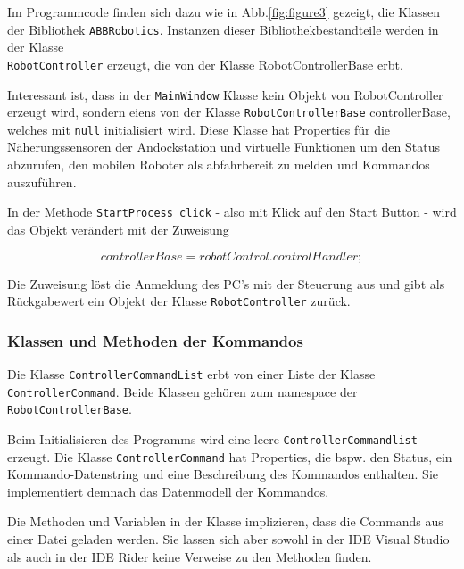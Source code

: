 Im Programmcode finden sich dazu wie in Abb.\ref{fig:figure3} gezeigt, die Klassen der Bibliothek \verb|ABBRobotics|.
Instanzen dieser Bibliothekbestandteile werden in der Klasse\\ \verb|RobotController| erzeugt, die von der Klasse
RobotControllerBase erbt.

Interessant ist, dass in der \verb|MainWindow| Klasse kein Objekt von RobotController erzeugt wird, sondern eiens von der Klasse
\verb|RobotControllerBase| \glqq controllerBase\grqq{}, welches mit \verb|null| initialisiert wird. 
Diese Klasse hat Properties für die Näherungssensoren der Andockstation und virtuelle Funktionen um den Status abzurufen, 
den mobilen Roboter als abfahrbereit zu melden und Kommandos auszuführen. 

In der Methode \verb|StartProcess_click| - also mit Klick auf den Start Button - wird das Objekt verändert mit der Zuweisung

$$controllerBase = robotControl.controlHandler;$$

Die Zuweisung löst die Anmeldung des PC's mit der Steuerung aus und gibt als Rückgabewert ein Objekt der Klasse \verb|RobotController| zurück. 

\subsubsection{Klassen und Methoden der Kommandos}

Die Klasse \verb|ControllerCommandList| erbt von einer Liste der Klasse\\ 
\verb|ControllerCommand|.  Beide Klassen gehören zum namespace der 
\verb|RobotControllerBase|.

Beim Initialisieren des Programms wird eine leere \verb|ControllerCommandlist| erzeugt. 
Die Klasse \verb|ControllerCommand| hat Properties, die bspw. den Status, ein Kommando-Datenstring und eine Beschreibung des Kommandos enthalten. 
Sie implementiert demnach das Datenmodell der Kommandos. 

Die Methoden und Variablen in der Klasse implizieren, dass die Commands aus einer Datei geladen werden.
Sie lassen sich aber sowohl in der IDE Visual Studio als auch in der IDE Rider keine Verweise zu den Methoden finden.

